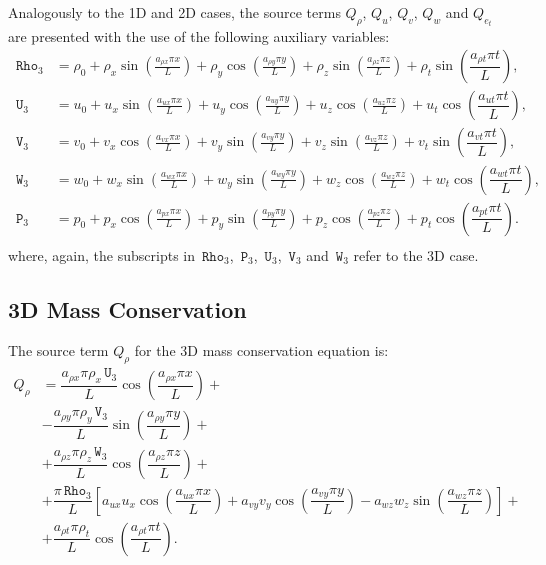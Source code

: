 \documentclass[10pt]{article}
\newcommand{\Rho}{\,\mathtt{Rho}}
\newcommand{\PP}{\,\mathtt{P}}
\newcommand{\U}{\,\mathtt{U}}
\newcommand{\V}{\,\mathtt{V}}
\newcommand{\W}{\,\mathtt{W}}
\begin{document}
Analogously to the 1D and 2D cases, the source terms $Q_\rho$, $Q_u$, $Q_v$, $Q_w$ and $Q_{e_t}$ are  presented with the use of the following auxiliary variables:
\begin{equation*}
 \begin{split}
\label{eq:aux}
\Rho_3 &= \rho_{0}+ \rho_{x} \sin\left(\frac{a_{ \rho  x} \pi x}{L}\right)+ \rho_{y} \cos\left(\frac{a_{ \rho  y} \pi y}{L}\right) + \rho_{z} \sin\left(\frac{a_{ \rho  z} \pi z}{L}\right)+ \rho_t \sin\left(\dfrac{a_{\rho t} \pi t}{L}\right),\\
\U_3 &=u_{0}+u_{x} \sin\left(\frac{a_{u  x} \pi x}{L}\right)+u_{y} \cos\left(\frac{a_{u  y} \pi y}{L}\right)+u_{z} \cos\left(\frac{a_{u  z} \pi z}{L}\right) + u_t \cos\left(\dfrac{a_{u t} \pi t}{L}\right) ,\\
\V_3 &= v_{0}+v_{x} \cos\left(\frac{a_{v  x} \pi x}{L}\right)+v_{y} \sin\left(\frac{a_{v  y} \pi y}{L}\right)+v_{z} \sin\left(\frac{a_{v  z} \pi z}{L}\right)+ v_t \sin\left(\dfrac{a_{v t} \pi t}{L}\right), \\
\W_3 &= w_{0}+w_{x} \sin\left(\frac{a_{w  x} \pi x}{L}\right)+w_{y} \sin\left(\frac{a_{w  y} \pi y}{L}\right)+ w_{z} \cos\left(\frac{a_{w  z} \pi z}{L}\right) + w_t \cos\left(\dfrac{a_{w t} \pi t}{L}\right),\\
\PP_3 &= p_{0}+p_{x} \cos\left(\frac{a_{p  x} \pi x}{L}\right)+p_{y} \sin\left(\frac{a_{p  y} \pi y}{L}\right)+ p_{z} \cos\left(\frac{a_{p  z} \pi z}{L}\right)+ p_t \cos\left(\dfrac{a_{p t} \pi t}{L}\right).\\
\end{split}
\end{equation*}
where, again, the subscripts in $\Rho_3$, $\PP_3$, $\U_3$, $\V_3$ and $\W_3$ refer to the 3D case.

\subsection{3D Mass Conservation}

The source term $Q_{\rho}$ for the 3D mass conservation equation is:
\begin{equation}
 \begin{split}
Q_\rho &=\dfrac{ a_{\rho x} \pi \rho_x \U_3}{L} \cos\left(\dfrac{a_{\rho x} \pi x}{L}\right)+\\
&-\dfrac{a_{\rho y} \pi \rho_y \V_3 }{L}\sin\left(\dfrac{a_{\rho y} \pi y}{L}\right)+\\
&+\dfrac{a_{\rho z} \pi \rho_z \W_3 }{L}\cos\left(\dfrac{a_{\rho z}\pi z }{L}\right)+\\
&+\dfrac{\pi \Rho_3}{L}\left[a_{ux} u_x \cos\left(\dfrac{a_{ux} \pi x}{L}\right)+a_{vy} v_y \cos\left(\dfrac{a_{vy} \pi y}{L}\right)-a_{wz} w_z \sin\left(\dfrac{a_{wz}\pi z }{L}\right)\right]+\\
&+\dfrac{a_{\rho t} \pi \rho_t }{L}\cos\left(\dfrac{a_{\rho t} \pi t}{L}\right).
 \end{split}
\end{equation}
\end{document}
